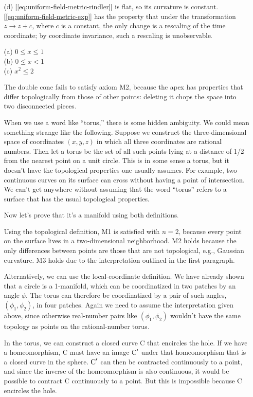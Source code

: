 (d) [\ref{eq:uniform-field-metric-rindler}] is flat, so its curvature is constant. [\ref{eq:uniform-field-metric-exp}] has the
property that under the transformation $z\rightarrow z+c$, where $c$ is a constant, the only change is a rescaling of the
time coordinate; by coordinate invariance, such a rescaling is unobservable.

(a) $0 \le x \le 1$\\
(b) $0 \le x < 1$\\
(c) $x^2 \le 2$

The double cone fails to satisfy axiom M2, because the apex has properties that differ topologically from those of
other points: deleting it chops the space into two disconnected pieces.

When we use a word like ``torus,'' there is some hidden ambiguity. We could mean something strange like the following. Suppose
we construct the three-dimensional space of coordinates $(x,y,z)$ in which all three coordinates are rational numbers. Then let
a torus be the set of all such points lying at a distance of 1/2 from the nearest point on a unit circle. This is in some sense
a torus, but it doesn't have the topological properties one usually assumes. For example, two continuous curves on its surface can cross
without having a point of intersection. We can't get anywhere without assuming that the word ``torus'' refers to a surface that
has the usual topological properties.

Now let's prove that it's a manifold using both definitions.

Using the topological definition, M1 is satisfied with $n=2$, because every point on the
surface lives in a two-dimensional neighborhood. M2 holds because the only differences between points are those that are not
topological, e.g., Gaussian curvature. M3 holds due to the interpretation outlined in the first paragraph.

Alternatively, we can use the local-coordinate definition. We have already shown that a circle
is a 1-manifold, which can be coordinatized in two patches by an angle $\phi$. The torus can therefore be coordinatized by
a pair of such angles, $(\phi_1,\phi_2)$, in four patches. Again we need to assume the interpretation given above, since
otherwise real-number pairs like $(\phi_1,\phi_2)$ wouldn't have the same topology as points on the rational-number torus.

In the torus, we can construct a closed curve C that encircles the hole. If we have a homeomorphism, C must have
an image $\textup{C}'$ under that homeomorphism that is a closed curve in the sphere.  $\textup{C}'$ can then be
contracted continuously to a point, and since the inverse of the homeomorphism is also continuous, it would be
possible to contract C continuously to a point. But this is impossible because C encircles the hole.

